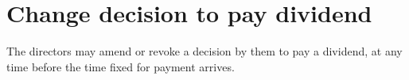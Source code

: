 \section{Change decision to pay dividend}

The directors may amend or revoke a decision by them to pay a dividend, at any time before the time fixed for payment arrives. 